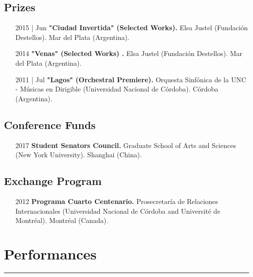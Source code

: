 \documentclass[12pt]{article}%
\begin{document}
\subsection{Prizes}%
\begin{itemize}[align=parleft,leftmargin=2.25cm,labelwidth=2cm]
\item[2015 | Jun]
\textbf{"Ciudad Invertida" (Selected Works).}
Elsa Justel (Fundación Destellos). 
Mar del Plata (Argentina). 
\end{itemize}%
\begin{itemize}[align=parleft,leftmargin=2.25cm,labelwidth=2cm]
\item[2014]
\textbf{"Venas" (Selected Works) .}
Elsa Justel (Fundación Destellos). 
Mar del Plata (Argentina). 
\end{itemize}%
\begin{itemize}[align=parleft,leftmargin=2.25cm,labelwidth=2cm]
\item[2011 | Jul]
\textbf{"Lagos" (Orchestral Premiere).}
Orquesta Sinfónica de la UNC {-} Músicas en Dirigible (Universidad Nacional de Córdoba). 
Córdoba (Argentina). 
\end{itemize}%
\subsection{Conference Funds}%
\begin{itemize}[align=parleft,leftmargin=2.25cm,labelwidth=2cm]
\item[2017]
\textbf{Student Senators Council.}
Graduate School of Arts and Sciences (New York University). 
Shanghai (China). 
\end{itemize}%
\subsection{Exchange Program}%
\begin{itemize}[align=parleft,leftmargin=2.25cm,labelwidth=2cm]
\item[2012]
\textbf{Programa Cuarto Centenario.}
Prosecretaría de Relaciones Internacionales (Universidad Nacional de Córdoba and Université de Montréal). 
Montréal (Canada). 
\end{itemize}

%
\section{Performances}%
\label{sec:Performances}%
\hrule%
\end{document}

